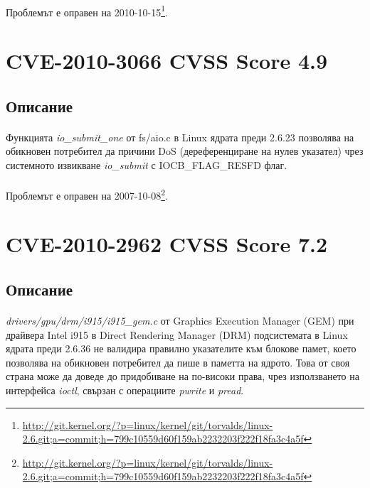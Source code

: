 \documentclass[a4paper,12pt,leqno]{article}
\begin{document}
\paragraph{}
Проблемът е оправен на 2010-10-15\footnote{\url{http://git.kernel.org/?p=linux/kernel/git/torvalds/linux-2.6.git;a=commit;h=799c10559d60f159ab2232203f222f18fa3c4a5f}}.

\section{CVE-2010-3066 CVSS Score 4.9}
\subsection{Описание}
\paragraph{}
Функцията \textit{io\_submit\_one} от fs/aio.c в Linux ядрата преди 2.6.23 позволява на обикновен потребител да причини DoS (дереференциране на нулев указател) чрез системното извикване \textit{io\_submit} с IOCB\_FLAG\_RESFD флаг.
\paragraph{}
Проблемът е оправен на 2007-10-08\footnote{\url{http://git.kernel.org/?p=linux/kernel/git/torvalds/linux-2.6.git;a=commit;h=799c10559d60f159ab2232203f222f18fa3c4a5f}}.

\section{CVE-2010-2962 CVSS Score 7.2}
\subsection{Описание}
\paragraph{}
\textit{drivers/gpu/drm/i915/i915\_gem.c} от Graphics Execution Manager (GEM) при драйвера Intel i915 в Direct Rendering Manager (DRM) подсистемата в Linux ядрата преди 2.6.36 не валидира правилно указателите към блокове памет, което позволява на обикновен потребител да пише в паметта на ядрото. Това от своя страна може да доведе до придобиване на по-високи права, чрез използването на интерфейса \textit{ioctl}, свързан с операциите \textit{pwrite} и \textit{pread}.
\end{document}
